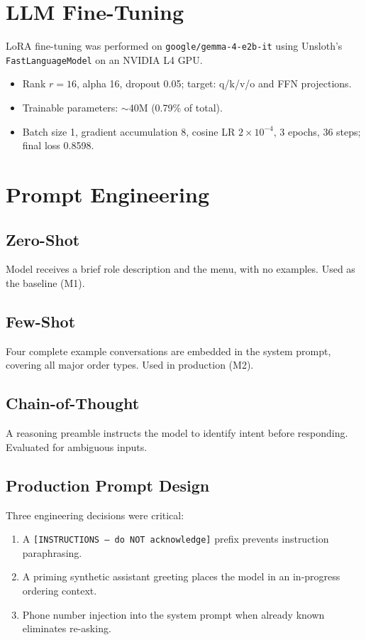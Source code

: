 \documentclass[12pt,a4paper]{report}
\begin{document}
\section{LLM Fine-Tuning}
LoRA fine-tuning was performed on \texttt{google/gemma-4-e2b-it} using Unsloth's \texttt{FastLanguageModel} on an NVIDIA L4 GPU.

\begin{itemize}
    \item Rank $r=16$, alpha 16, dropout 0.05; target: q/k/v/o and FFN projections.
    \item Trainable parameters: $\sim$40M (0.79\% of total).
    \item Batch size 1, gradient accumulation 8, cosine LR $2\times10^{-4}$, 3 epochs, 36 steps; final loss 0.8598.
\end{itemize}

\section{Prompt Engineering}

\subsection{Zero-Shot}
Model receives a brief role description and the menu, with no examples. Used as the baseline (M1).

\subsection{Few-Shot}
Four complete example conversations are embedded in the system prompt, covering all major order types. Used in production (M2).

\subsection{Chain-of-Thought}
A reasoning preamble instructs the model to identify intent before responding. Evaluated for ambiguous inputs.

\subsection{Production Prompt Design}
Three engineering decisions were critical:
\begin{enumerate}
    \item A \texttt{[INSTRUCTIONS --- do NOT acknowledge]} prefix prevents instruction paraphrasing.
    \item A priming synthetic assistant greeting places the model in an in-progress ordering context.
    \item Phone number injection into the system prompt when already known eliminates re-asking.
\end{enumerate}
\end{document}
